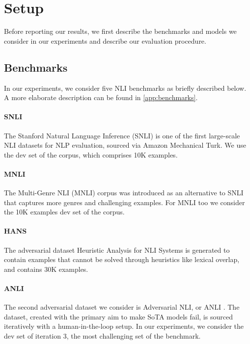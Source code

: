 \section{Setup}

Before reporting our results, we first describe the benchmarks and models we consider in our experiments and describe our evaluation procedure.

\subsection{Benchmarks}
In our experiments, we consider five NLI benchmarks as briefly described below. 
A more elaborate description can be found in \cref{app:benchmarks}.

\vspace{-1mm}
\paragraph{SNLI}
The Stanford Natural Language Inference (SNLI) is one of the first large-scale NLI datasets for NLP evaluation, sourced via Amazon Mechanical Turk.
We use the dev set of the corpus, which comprises 10K examples.

\vspace{-1mm}
\paragraph{MNLI}
The Multi-Genre NLI (MNLI) corpus \citep{williams-etal-2018-broad} was introduced as an alternative to SNLI that captures more genres and challenging examples. For MNLI too we consider the 10K examples dev set of the corpus.

\vspace{-1mm}
\paragraph{HANS}
The adversarial dataset Heuristic Analysis for NLI Systems \citep[HANS,][]{mccoy-etal-2019-right} is generated to contain examples that cannot be solved through heuristics like lexical overlap, and contains 30K examples.

\vspace{-1mm}
\paragraph{ANLI}
The second adversarial dataset we consider is Adversarial NLI, or ANLI \citep{nie-etal-2020-adversarial}.
The dataset, created with the primary aim to make SoTA models fail, is sourced iteratively with a human-in-the-loop setup.
In our experiments, we consider the dev set of iteration 3, the most challenging set of the benchmark.


